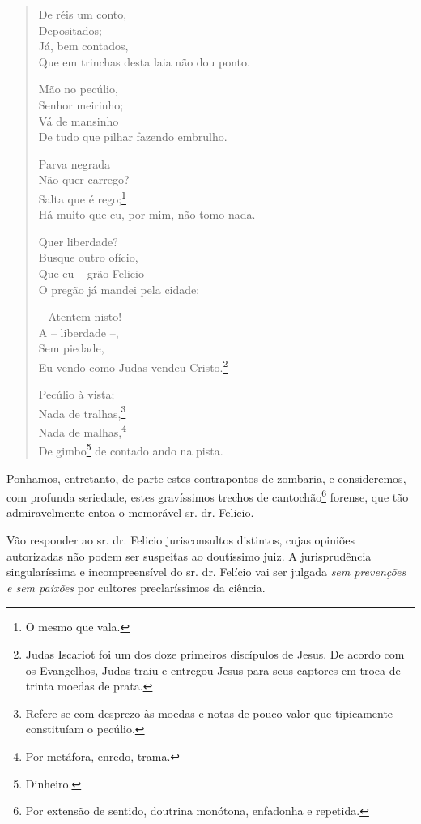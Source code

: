 \begin{verse}
De réis um conto,\\
Depositados;\\
Já, bem contados,\\
Que em trinchas desta laia não dou ponto.

Mão no pecúlio,\\
Senhor meirinho;\\
Vá de mansinho\\
De tudo que pilhar fazendo embrulho.

Parva negrada\\
Não quer carrego?\\
Salta que é rego;\footnote{ O mesmo que vala.}\\
Há muito que eu, por mim, não tomo nada.

Quer liberdade?\\
Busque outro ofício,\\
Que eu -- grão Felicio --\\
O pregão já mandei pela cidade:

-- Atentem nisto!\\
A -- liberdade --,\\
Sem piedade,\\
Eu vendo como Judas vendeu Cristo.\footnote{ Judas Iscariot foi um dos
  doze primeiros discípulos de Jesus. De acordo com os Evangelhos, Judas
  traiu e entregou Jesus para seus captores em troca de trinta moedas de
  prata.}

Pecúlio à vista;\\
Nada de tralhas,\footnote{Refere-se com desprezo às moedas e notas de
  pouco valor que tipicamente constituíam o pecúlio.}\\
Nada de malhas,\footnote{ Por metáfora, enredo, trama.}\\
De gimbo\footnote{Dinheiro.} de contado ando na pista.
\end{verse}

Ponhamos, entretanto, de parte estes contrapontos de zombaria, e
consideremos, com profunda seriedade, estes gravíssimos trechos de
cantochão\footnote{ Por extensão de sentido, doutrina monótona,
  enfadonha e repetida.} forense, que tão admiravelmente entoa o
memorável sr. dr. Felicio.

\asterisc

Vão responder ao sr. dr. Felicio jurisconsultos distintos, cujas
opiniões autorizadas não podem ser suspeitas ao doutíssimo juiz. A
jurisprudência singularíssima e incompreensível do sr. dr. Felício vai
ser julgada \emph{sem prevenções e sem paixões} por cultores
preclaríssimos da ciência.

